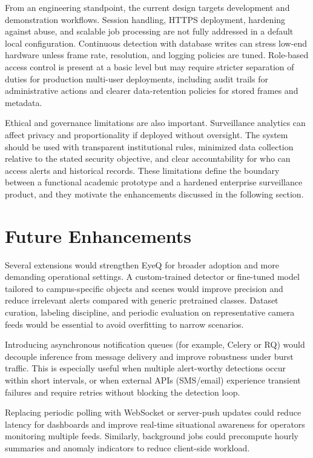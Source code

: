 \documentclass[10pt,openany]{report}
\begin{document}
\begin{sloppypar}
{{{\begin{sloppypar}
From an engineering standpoint, the current design targets development and demonstration workflows. Session handling, HTTPS deployment, hardening against abuse, and scalable job processing are not fully addressed in a default local configuration. Continuous detection with database writes can stress low-end hardware unless frame rate, resolution, and logging policies are tuned. Role-based access control is present at a basic level but may require stricter separation of duties for production multi-user deployments, including audit trails for administrative actions and clearer data-retention policies for stored frames and metadata.

Ethical and governance limitations are also important. Surveillance analytics can affect privacy and proportionality if deployed without oversight. The system should be used with transparent institutional rules, minimized data collection relative to the stated security objective, and clear accountability for who can access alerts and historical records. These limitations define the boundary between a functional academic prototype and a hardened enterprise surveillance product, and they motivate the enhancements discussed in the following section.

\section{Future Enhancements}

Several extensions would strengthen EyeQ for broader adoption and more demanding operational settings. A custom-trained detector or fine-tuned model tailored to campus-specific objects and scenes would improve precision and reduce irrelevant alerts compared with generic pretrained classes. Dataset curation, labeling discipline, and periodic evaluation on representative camera feeds would be essential to avoid overfitting to narrow scenarios.

Introducing asynchronous notification queues (for example, Celery or RQ) would decouple inference from message delivery and improve robustness under burst traffic. This is especially useful when multiple alert-worthy detections occur within short intervals, or when external APIs (SMS/email) experience transient failures and require retries without blocking the detection loop.

Replacing periodic polling with WebSocket or server-push updates could reduce latency for dashboards and improve real-time situational awareness for operators monitoring multiple feeds. Similarly, background jobs could precompute hourly summaries and anomaly indicators to reduce client-side workload.


\end{sloppypar}}}}
\end{sloppypar}
\end{document}

